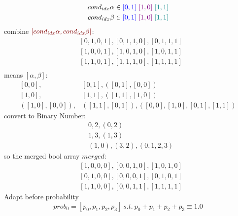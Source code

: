 \begin{equation}
    \begin{split}
    cond_{idx}\alpha & \in \textcolor{blue}{[0, 1]} \ \textcolor{violet}{[1, 0]}\ \textcolor{teal}{[1, 1]} \\
    cond_{idx}\beta & \in \textcolor{blue}{[0, 1]} \ \textcolor{violet}{[1, 0]}\ \textcolor{teal}{[1, 1]} 
    \end{split}
\end{equation}
combine $\textcolor{darkred}{[cond_{idx}\alpha, cond_{idx}\beta]}$:
\begin{equation}
    \begin{split}
        & [0, 1, 0, 1], [0, 1, 1, 0], [0, 1, 1, 1] \\
        & [1, 0, 0, 1], [1, 0, 1, 0], [1, 0, 1, 1] \\
        & [1, 1, 0, 1], [1, 1, 1, 0], [1, 1, 1, 1] \\
    \end{split}
\end{equation}
means $[\alpha, \beta]$:
\begin{equation}
    \begin{split}
        [0, 0], & [0, 1], ([0, 1], [0, 0]) \\
        [1, 0], & [1, 1], ([1, 1], [1, 0]) \\
        ([1, 0], [0, 0]), & ([1, 1], [0, 1]), ([0, 0], [1, 0], [0, 1], [1, 1])
    \end{split}
\end{equation}
convert to Binary Number:
\begin{equation}
    \begin{split}
        &0, 2, (0, 2) \\
        &1, 3, (1, 3) \\
        &(1, 0), (3, 2) , (0, 1, 2, 3)
    \end{split}
\end{equation}
so the merged bool array $merged$:
\begin{equation}
    \begin{split}
        &[1, 0, 0, 0], [0, 0, 1, 0], [1, 0, 1, 0] \\
        &[0, 1, 0, 0], [0, 0, 0, 1], [0, 1, 0, 1] \\
        &[1, 1, 0, 0], [0, 0, 1, 1], [1, 1, 1, 1]
    \end{split}
\end{equation}
\noindent Adapt before probability
\begin{equation}
    prob_0 = [p_0, p_1, p_2, p_3] \ s.t.\ p_0 + p_1 + p_2 + p_3 \equiv 1.0
\end{equation}
